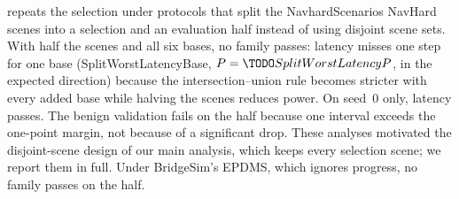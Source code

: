  repeats the selection under protocols that split the \num{NavhardScenarios}
NavHard scenes into a selection and an evaluation half instead of using disjoint scene sets.
With half the scenes and all six bases, no family passes: latency misses one step for one base
(\num{SplitWorstLatencyBase}, $P=\num{SplitWorstLatencyP}$, in the expected direction) because the
intersection--union rule becomes stricter with every added base while halving the scenes reduces power.
On seed~0 only, latency passes.
The benign validation fails on the half because one interval exceeds the one-point margin, not because
of a significant drop.
These analyses motivated the disjoint-scene design of our main analysis, which keeps every selection
scene; we report them in full.
Under BridgeSim's EPDMS, which ignores progress, no family passes on the half.
